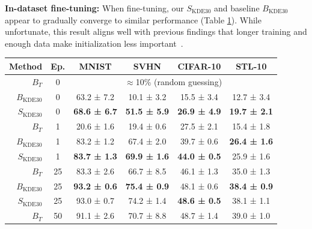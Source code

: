 \documentclass{article}
\begin{document}
\vspace{8pt}

\textbf{In-dataset fine-tuning:} 
When fine-tuning, our $S_{\text{KDE}30}$ and baseline $B_{\text{KDE}30}$ appear to gradually converge to similar performance (Table \ref{tab:initialization}). While unfortunate, this result aligns well with previous findings that longer training and enough data make initialization less important~\citep{mishkinAllYouNeed2016,he2019rethinking,rasmus2015semi}.
\begin{table}
\vspace{-2mm}
\label{tab:initialization}
\vspace{2mm}
\scriptsize
\setlength{\tabcolsep}{6pt}
\begin{tabularx}{\linewidth}{rccccc}
\toprule
\multicolumn{1}{r}{\textbf{Method}} & \textbf{Ep.} & \multicolumn{1}{c}{\textbf{MNIST}} & \multicolumn{1}{c}{\textbf{SVHN}} &
\multicolumn{1}{c}{\textbf{CIFAR-10}} & \multicolumn{1}{c}{\textbf{STL-10}} \\
\midrule
$B_{T}$                & 0 &  \multicolumn{4}{c}{$\approx$10\% (random guessing)}\\
$B_{\text{KDE}30}$   & 0     & {63.2 ± 7.2}   & 10.1 ± 3.2           & 
15.5 ± 3.4           & 12.7 ± 3.4  \\
$S_{\text{KDE}30}$   & 0     & \textbf{68.6 ± 6.7}   & \textbf{51.5 ± 5.9}  & 
\textbf{26.9 ± 4.9}  & \textbf{19.7 ± 2.1}  \\
\midrule
$B_{T}$                & 1      & 20.6 ± 1.6           & 19.4 ± 0.6           & 
27.5 ± 2.1           & 15.4 ± 1.8  \\
$B_{\text{KDE}30}$   & 1     & {83.2 ± 1.2}   & 67.4 ± 2.0 	        & 
39.7 ± 0.6           &	\textbf{26.4 ± 1.6} \\
$S_{\text{KDE}30}$   & 1     & \textbf{83.7 ± 1.3}   & \textbf{69.9 ± 1.6}  &
\textbf{44.0 ± 0.5}  &	{25.9 ± 1.6}  \\
\midrule
$B_{T}$                & 25     & 83.3 ± 2.6           & 66.7 ± 8.5           & 
46.1 ± 1.3           & 35.0 ± 1.3  \\
$B_{\text{KDE}30}$   & 25    & \textbf{93.2 ± 0.6}   & \textbf{75.4 ± 0.9}  & 
{48.1 ± 0.6}  & \textbf{38.4 ± 0.9}  \\
$S_{\text{KDE}30}$   & 25    & {93.0 ± 0.7}    & {74.2 ± 1.4} &
\textbf{48.6 ± 0.5}  & {38.1 ± 1.1}  \\
\midrule
$B_{T}$                & 50     & 91.1 ± 2.6           & 70.7 ± 8.8           & 
48.7 ± 1.4           & 39.0 ± 1.0  \\

\bottomrule 
\end{tabularx}
\vspace{-4mm}
\end{table} 
\end{document}
